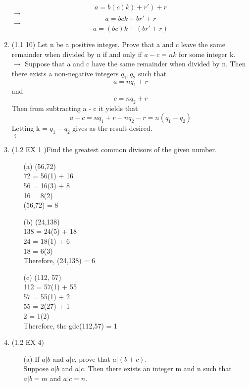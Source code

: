 \documentclass[12pt]{article}
\begin{document}
\begin{enumerate}
    \begin{equation*}
        a = b (c(k) +r') + r 
    \end{equation*}
    $\to$
    \begin{equation*}
        a = b c k + b r' + r
    \end{equation*}
    $\to $
    \begin{equation*}
        a = (bc) k + (br' + r)
    \end{equation*}
    \item (1.1 10) Let n be a positive integer. Prove that a and c leave the same remainder when divided by n if and only if $a - c = n k$ for some integer k. \\
    $\longrightarrow$
    Suppose that a and c have the same remainder when divided by n. Then there exists a non-negative integers $q_1, q_2$ such that 
    \begin{equation*}
        a = nq_1 + r
    \end{equation*}
    and 
    \begin{equation*}
        c = n q_2 + r 
    \end{equation*}
    Then from subtracting a - c it yields that 
    \begin{equation*}
        a - c = nq_1 + r - nq_2 - r = n(q_1 - q_2)
    \end{equation*}
    Letting k = $q_1 - q_2$ gives as the result desired. \\
    $\longleftarrow$ 
    \item (1.2 EX 1 )Find the greatest common divisors of the given number. 
    \begin{itemize}
        \item[(a)] (56,72) \\
        72 = 56(1) + 16 \\
        56 = 16(3) + 8 \\
        16 = 8(2) \\
        (56,72) = 8 
        \item[(b)] (24,138) \\
        138 = 24(5) + 18 \\
        24 = 18(1) + 6 \\
        18 = 6(3) \\
        Therefore, (24,138) = 6 
        \item[(c)] (112, 57) \\
        112 = 57(1) + 55 \\
        57 = 55(1) + 2 \\
        55 = 2(27) + 1 \\
        2 = 1(2) \\
        Therefore, the gdc(112,57) = 1
    \end{itemize}
    \item (1.2 EX 4) 
    \begin{itemize}
        \item[(a)] If $a|b$ and $a|c$, prove that $a|(b+c)$. \\
        Suppose $a|b$ and $a|c$. Then there exists an integer m and n such that $a|b = m$ and $a|c = n$. 
    \end{itemize}
\end{enumerate}
\end{document}
